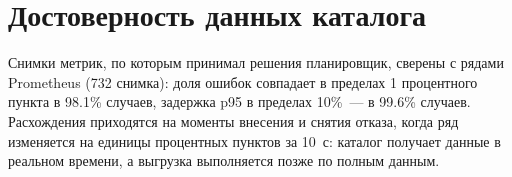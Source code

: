 \section{Достоверность данных каталога}

Снимки метрик, по которым принимал решения планировщик, сверены с рядами
Prometheus (732 снимка): доля ошибок совпадает в пределах 1 процентного
пункта в 98.1\% случаев, задержка p95 в пределах 10\%~--- в 99.6\% случаев.
Расхождения приходятся на моменты внесения и снятия отказа, когда ряд
изменяется на единицы процентных пунктов за 10~с: каталог получает данные в
реальном времени, а выгрузка выполняется позже по полным данным.
